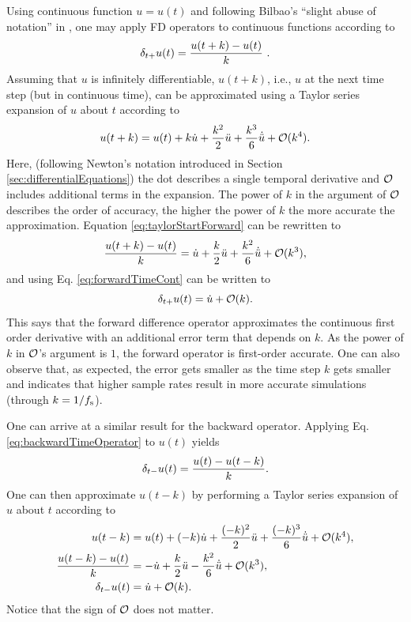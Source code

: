 Using continuous function $u=u(t)$ and following Bilbao's ``slight abuse of notation'' in \cite{theBible}, one may apply FD operators to continuous functions according to 
\begin{equation}\label{eq:forwardTimeCont}
    \delta_{t+} u(t) = \frac{u(t+k) - u(t)}{k}\ .
\end{equation}
%
Assuming that $u$ is infinitely differentiable, $u(t+k)$, i.e., $u$ at the next time step (but in continuous time), can be approximated using a Taylor series expansion of $u$ about $t$ according to
\begin{equation}\label{eq:taylorStartForward}
    u(t+k) = u(t) + k \dot u + \frac{k^2}{2} \ddot u + \frac{k^3}{6} \dot{\ddot{u}} + \mathcal{O}(k^4).
\end{equation}
Here, (following Newton's notation introduced in Section \ref{sec:differentialEquations}) the dot describes a single temporal derivative and $\mathcal{O}$ includes additional terms in the expansion. The power of $k$ in the argument of $\mathcal{O}$ describes the order of accuracy, the higher the power of $k$ the more accurate the approximation. Equation \eqref{eq:taylorStartForward} can be rewritten to 
\begin{equation*}
    \frac{u(t+k) - u(t)}{k} = \dot u + \frac{k}{2} \ddot u +\frac{k^2}{6} \dot{\ddot{u}} + \mathcal{O}(k^3),
\end{equation*}
and using Eq. \eqref{eq:forwardTimeCont} can be written to
\begin{equation}
    \delta_{t+} u(t) = \dot u + \mathcal{O}(k).
\end{equation}
This says that the forward difference operator approximates the continuous first order derivative with an additional error term that depends on $k$.
As the power of $k$ in $\mathcal{O}$'s argument is $1$, the forward operator is first-order accurate. One can also observe that, as expected, the error gets smaller as the time step $k$ gets smaller and indicates that higher sample rates result in more accurate simulations (through $k=1/f_\text{s}$).

One can arrive at a similar result for the backward operator. Applying Eq. \eqref{eq:backwardTimeOperator} to $u(t) $ yields
\begin{equation}
    \delta_{t-} u(t) = \frac{u(t) - u(t-k)}{k}.
\end{equation}
One can then approximate $u(t-k)$ by performing a Taylor series expansion of $u$ about $t$ according to
\begin{align}
    u(t-k) &= u(t) + (-k) \dot u + \frac{(-k)^2}{2} \ddot u +\frac{(-k)^3}{6}\dot{\ddot{u}} + \mathcal{O}(k^4),\label{eq:taylorStartBackward}\\
    \frac{u(t-k) - u(t)}{k} &= -\dot u + \frac{k}{2} \ddot u - \frac{k^2}{6}\dot{\ddot{u}} + \mathcal{O}(k^3),\nonumber\\
    \delta_{t-} u(t) &= \dot u + \mathcal{O}(k).
\end{align}
Notice that the sign of $\mathcal{O}$ does not matter.

